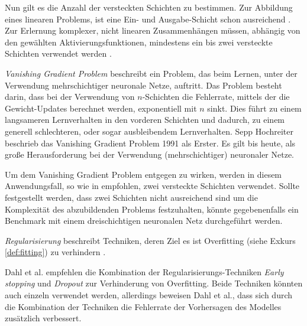 Nun gilt es die Anzahl der versteckten Schichten zu bestimmen. Zur Abbildung eines linearen Problems, ist eine Ein- und Ausgabe-Schicht schon ausreichend \cite{MN89}. Zur Erlernung komplexer, nicht linearen Zusammenhängen müssen, abhängig von den gewählten Aktivierungsfunktionen, mindestens ein bis zwei versteckte Schichten verwendet werden \cite{FAQ15, LA09}.   

\begin{definition}
\begin{shaded}
\emph{Vanishing Gradient Problem} beschreibt ein Problem, das beim Lernen, unter der Verwendung mehrschichtiger neuronale Netze, auftritt. Das Problem besteht darin, dass bei der Verwendung von $n$-Schichten die Fehlerrate,  mittels der die Gewicht-Updates berechnet werden, exponentiell mit $n$ sinkt. Dies führt zu einem langsameren Lernverhalten in den vorderen Schichten und dadurch, zu einem generell schlechteren, oder sogar ausbleibendem Lernverhalten. Sepp Hochreiter \cite{SH91} beschrieb das Vanishing Gradient Problem 1991 als Erster. Es gilt bis heute, als große Herausforderung bei der Verwendung (mehrschichtiger) neuronaler Netze.        
\label{def:vanishing}
\end{shaded}
\end{definition}

Um dem Vanishing Gradient Problem entgegen zu wirken, werden in diesem Anwendungsfall, so wie in \cite{FAQ15, LA09} empfohlen, zwei versteckte Schichten verwendet. Sollte festgestellt werden, dass zwei Schichten nicht ausreichend sind um die Komplexität des abzubildenden Problems festzuhalten, könnte gegebenenfalls ein Benchmark mit einem dreischichtigen neuronalen Netz durchgeführt werden. 

\begin{definition}
\begin{shaded}
\emph{Regularisierung} beschreibt Techniken, deren Ziel es ist Overfitting (siehe Exkurs \ref{def:fitting}) zu verhindern \cite{QU17}.
\label{def:regularization}
\end{shaded}
\end{definition} 

Dahl et al. \cite{DA13} empfehlen die Kombination der Regularisierungs-Techniken \emph{Early stopping} und \emph{Dropout} zur Verhinderung von Overfitting. Beide Techniken könnten auch einzeln verwendet werden, allerdings beweisen Dahl et al., dass sich durch die Kombination der Techniken die Fehlerrate der Vorhersagen des Modelles zusätzlich verbessert.

